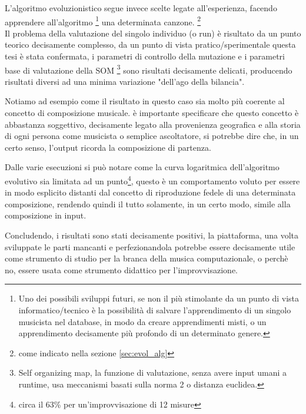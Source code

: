 L'algoritmo evoluzionistico segue invece scelte legate all'esperienza,
facendo apprendere all'algoritmo
\footnote{Uno dei possibili sviluppi futuri, se non il più stimolante da un
punto di vista informatico/tecnico è la possibilità di salvare l'apprendimento
di un singolo musicista nel database, in modo da creare apprendimenti misti,
o un apprendimento decisamente più profondo di un determinato genere.}
una determinata canzone. \footnote{come indicato nella sezione \ref{sec:evol_alg}}
\\
Il problema della valutazione del singolo individuo (o run) è risultato da un
punto teorico decisamente complesso, da un punto di vista pratico/sperimentale
questa tesi è stata confermata, i parametri di controllo della mutazione e
i parametri base di valutazione della SOM
\footnote{Self organizing map, la funzione di valutazione,
senza avere input umani a runtime, usa meccanismi basati sulla norma 2
o distanza euclidea.}
sono risultati decisamente delicati, producendo risultati diversi ad una minima
variazione "dell'ago della bilancia".


Notiamo ad esempio come il risultato in questo caso sia molto più coerente al
concetto di composizione musicale.
è importante specificare che questo concetto è abbastanza soggettivo,
decisamente legato alla provenienza geografica e alla storia di ogni persona
come musicista o semplice ascoltatore, si potrebbe dire che, in un certo senso,
l'output ricorda la composizione di partenza.

Dalle varie esecuzioni si può notare come la curva logaritmica dell'algoritmo
evolutivo sia limitata ad un punto\footnote{circa il 63\% per un'improvvisazione
di 12 misure}, questo è un comportamento voluto
per essere in modo esplicito distanti dal concetto di riproduzione fedele di una
determinata composizione, rendendo quindi il tutto solamente, in un certo modo,
simile alla composizione in input.

Concludendo, i risultati sono stati decisamente positivi, la piattaforma, una volta
sviluppate le parti mancanti e perfezionandola potrebbe essere decisamente utile
come strumento di studio per la branca della musica computazionale, o perchè no,
essere usata come strumento didattico per l'improvvisazione.
